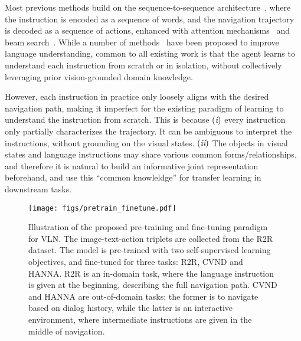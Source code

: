 \documentclass[10pt,twocolumn,letterpaper]{article}
\newcommand{\RN}[1]{\textup{\lowercase\expandafter{\it \romannumeral#1}}}
\begin{document}
Most previous methods build on the sequence-to-sequence architecture~\cite{sutskever2014sequence}, where the instruction is encoded as a sequence of words, and the navigation trajectory is decoded as a sequence of actions, enhanced with attention mechanisms~\cite{anderson2018vision,wang2018reinforced,ma2019self} and beam search~\cite{fried2018speaker}.  While a number of methods~\cite{misra2017mapping,monroe2017colors,wang2018look} have been proposed to improve language understanding, common to all existing work is that the agent learns to understand each instruction from scratch or in isolation, without collectively leveraging prior vision-grounded domain knowledge.

However, each instruction in practice only loosely aligns with the desired navigation path, making it imperfect for the existing paradigm of learning to understand the instruction from scratch. This is because 
$(\RN{1})$ every instruction only partially characterizes the trajectory. It can be ambiguous to interpret the instructions, without grounding on the visual states. 
$(\RN{2})$ The objects in visual states and language instructions may share various common forms/relationships, and therefore it is natural to build an informative joint representation beforehand, and use this ``common knowleldge'' for transfer learning in downstream tasks.

\begin{figure}[t!]\vspace{-0mm}\centering
	\texttt{[image: figs/pretrain\_finetune.pdf]}  
	\vspace{-0mm}
	\caption{Illustration of the proposed pre-training and fine-tuning paradigm for VLN. The image-text-action triplets are collected from the R2R dataset. The model is pre-trained with two self-supervised learning objectives, and fine-tuned for three tasks: R2R, CVND and HANNA. R2R is an in-domain task, where the language instruction is given at the beginning, describing the full navigation path. CVND and HANNA are out-of-domain tasks; the former is to navigate based on dialog history, while the latter is an interactive environment, where intermediate instructions are given in the middle of navigation.}
	\vspace{-3mm}
	\label{fig:pretrainig_finetuning_scheme}
\end{figure}
\end{document}
